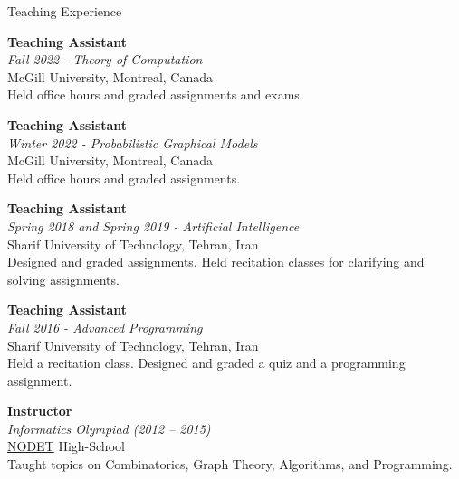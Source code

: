 \documentclass{resume}
\newcommand{\InternalSpace}{\vspace{0.18cm}}
\newcommand{\ExternalSpace}{\vspace{-0.09cm}}
\newenvironment{MySection}[1]
{\begin{category}{#1}}
{\end{category}}
\newcommand{\MyItem}{\citembullet}
\begin{document}
\begin{MySection}{Teaching Experience}

\MyItem \textbf{Teaching Assistant}\\
\textit{Fall 2022 - Theory of Computation}\\
McGill University, Montreal, Canada\\
\InternalSpace\ExternalSpace
Held office hours and graded assignments and exams.
\InternalSpace\ExternalSpace

\MyItem \textbf{Teaching Assistant}\\
\textit{Winter 2022 - Probabilistic Graphical Models}\\
McGill University, Montreal, Canada\\
\InternalSpace\ExternalSpace
Held office hours and graded assignments.
\InternalSpace\ExternalSpace

\MyItem \textbf{Teaching Assistant}\\
\textit{Spring 2018 and Spring 2019 - Artificial Intelligence}\\
Sharif University of Technology, Tehran, Iran\\
\InternalSpace\ExternalSpace
Designed and graded assignments.
Held recitation classes for clarifying and solving assignments.
\InternalSpace\ExternalSpace

\MyItem \textbf{Teaching Assistant}\\
\textit{Fall 2016 - Advanced Programming}\\
Sharif University of Technology, Tehran, Iran\\
\InternalSpace\ExternalSpace
Held a recitation class.
Designed and graded a quiz and a programming assignment.
\InternalSpace\ExternalSpace

\MyItem \textbf{Instructor} \hfill{}\\ 
\textit{Informatics Olympiad (2012 -- 2015)}\\
\href{https://en.wikipedia.org/wiki/National_Organization_for_Development_of_Exceptional_Talents}{NODET} High-School\\
\InternalSpace\ExternalSpace
Taught topics on Combinatorics, Graph Theory, Algorithms, and Programming.
\InternalSpace\ExternalSpace

\end{MySection}
\end{document}
